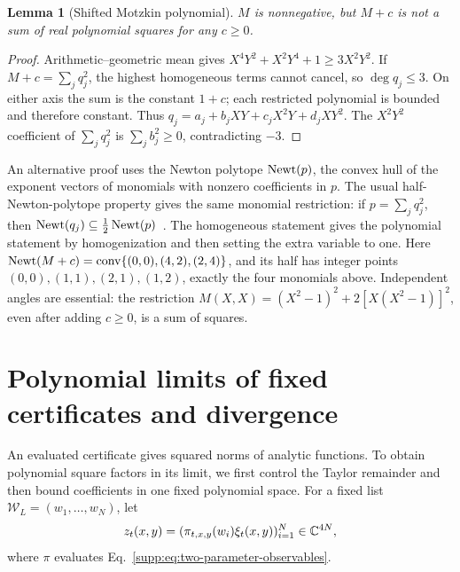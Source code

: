 \documentclass[11pt]{article}
\newtheorem{lemma}[theorem]{Lemma}
\theoremstyle{remark}\newtheorem{remark}[theorem]{Remark}
\begin{document}
\begin{lemma}[Shifted Motzkin polynomial]
\label{supp:lem:motzkin-not-sos}
$M$ is nonnegative, but $M+c$ is not a sum of real polynomial squares
for any $c\geq0$.
\end{lemma}
\begin{proof}
Arithmetic--geometric mean gives $X^4Y^2+X^2Y^4+1\geq3X^2Y^2$.
If $M+c=\sum_jq_j^2$, the highest homogeneous terms cannot cancel,
so $\deg q_j\leq3$. On either axis the sum is the constant $1+c$;
each restricted polynomial is bounded and therefore constant. Thus
$q_j=a_j+b_jXY+c_jX^2Y+d_jXY^2$. The $X^2Y^2$ coefficient of
$\sum_jq_j^2$ is $\sum_jb_j^2\geq0$, contradicting $-3$.
\end{proof}
An alternative proof uses the Newton polytope $\operatorname{Newt}(p)$, the convex hull
of the exponent vectors of monomials with nonzero coefficients in $p$.
The usual half-Newton-polytope property gives the same monomial restriction:
if $p=\sum_jq_j^2$, then
$\operatorname{Newt}(q_j)\subseteq\frac12\operatorname{Newt}(p)$~\cite[Theorem~1]{Reznick1978}.
The homogeneous statement gives the polynomial statement by homogenization
and then setting the extra variable to one. Here
$\operatorname{Newt}(M+c)=\operatorname{conv}\{(0,0),(4,2),(2,4)\}$, and its half
has integer points $(0,0),(1,1),(2,1),(1,2)$, exactly the four monomials
above. Independent angles are essential: the restriction
$M(X,X)=(X^2-1)^2+2[X(X^2-1)]^2$, even after adding $c\geq0$, is a
sum of squares.

\section{Polynomial limits of fixed certificates and divergence}
\label{supp:sec:compactness}\label{supp:sec:main-proof}
An evaluated certificate gives squared norms of analytic functions. To
obtain polynomial square factors in its limit, we first control the Taylor
remainder and then bound coefficients in one fixed polynomial space.
For a fixed list $\mathcal W_L=(w_1,\ldots,w_N)$, let
\begin{equation}
z_t(x,y)=(\pi_{t,x,y}(w_i)\xi_t(x,y))_{i=1}^N\in\mathbb C^{4N},
\label{supp:eq:z-vector}
\end{equation}
where $\pi$ evaluates Eq.~\eqref{supp:eq:two-parameter-observables}.
\end{document}

